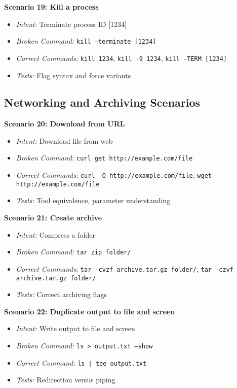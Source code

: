 \textbf{Scenario 19: Kill a process}
\begin{itemize}
	\item \textit{Intent:} Terminate process ID [1234]
	\item \textit{Broken Command:} \texttt{kill --terminate [1234]}
	\item \textit{Correct Commands:} \texttt{kill 1234}, \texttt{kill -9 1234}, \texttt{kill -TERM [1234]}
	\item \textit{Tests:} Flag syntax and force variants
\end{itemize}

\subsection{Networking and Archiving Scenarios}

\textbf{Scenario 20: Download from URL}
\begin{itemize}
	\item \textit{Intent:} Download file from web
	\item \textit{Broken Command:} \texttt{curl get http://example.com/file}
	\item \textit{Correct Commands:} \texttt{curl -O http://example.com/file}, \texttt{wget http://example.com/file}
	\item \textit{Tests:} Tool equivalence, parameter understanding
\end{itemize}

\textbf{Scenario 21: Create archive}
\begin{itemize}
	\item \textit{Intent:} Compress a folder
	\item \textit{Broken Command:} \texttt{tar zip folder/}
	\item \textit{Correct Commands:} \texttt{tar -cvzf archive.tar.gz folder/}, \texttt{tar -czvf archive.tar.gz folder/}
	\item \textit{Tests:} Correct archiving flags
\end{itemize}

\textbf{Scenario 22: Duplicate output to file and screen}
\begin{itemize}
	\item \textit{Intent:} Write output to file and screen
	\item \textit{Broken Command:} \texttt{ls > output.txt --show}
	\item \textit{Correct Command:} \texttt{ls | tee output.txt}
	\item \textit{Tests:} Redirection versus piping
\end{itemize}

